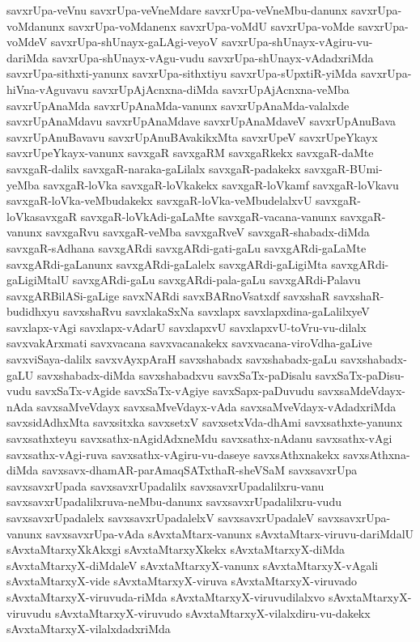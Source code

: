 {savxrUpa-veVnu
savxrUpa-veVneMdare
savxrUpa-veVneMbu-danunx
savxrUpa-voMdanunx
savxrUpa-voMdanenx
savxrUpa-voMdU
savxrUpa-voMde
savxrUpa-voMdeV
savxrUpa-shUnayx-gaLAgi-veyoV
savxrUpa-shUnayx-vAgiru-vu-dariMda
savxrUpa-shUnayx-vAgu-vudu
savxrUpa-shUnayx-vAdadxriMda
savxrUpa-sithxti-yanunx
savxrUpa-sithxtiyu
savxrUpa-sUpxtiR-yiMda
savxrUpa-hiVna-vAguvavu
savxrUpAjAcnxna-diMda
savxrUpAjAcnxna-veMba
savxrUpAnaMda
savxrUpAnaMda-vanunx
savxrUpAnaMda-valalxde
savxrUpAnaMdavu
savxrUpAnaMdave
savxrUpAnaMdaveV
savxrUpAnuBava
savxrUpAnuBavavu
savxrUpAnuBAvakikxMta
savxrUpeV
savxrUpeYkayx
savxrUpeYkayx-vanunx
savxgaR
savxgaRM
savxgaRkekx
savxgaR-daMte
savxgaR-dalilx
savxgaR-naraka-gaLilalx
savxgaR-padakekx
savxgaR-BUmi-yeMba
savxgaR-loVka
savxgaR-loVkakekx
savxgaR-loVkamf
savxgaR-loVkavu
savxgaR-loVka-veMbudakekx
savxgaR-loVka-veMbudelalxvU
savxgaR-loVkasavxgaR
savxgaR-loVkAdi-gaLaMte
savxgaR-vacana-vanunx
savxgaR-vanunx
savxgaRvu
savxgaR-veMba
savxgaRveV
savxgaR-shabadx-diMda
savxgaR-sAdhana
savxgARdi
savxgARdi-gati-gaLu
savxgARdi-gaLaMte
savxgARdi-gaLanunx
savxgARdi-gaLalelx
savxgARdi-gaLigiMta
savxgARdi-gaLigiMtalU
savxgARdi-gaLu
savxgARdi-pala-gaLu
savxgARdi-Palavu
savxgARBilASi-gaLige
savxNARdi
savxBARnoVsatxdf
savxshaR
savxshaR-budidhxyu
savxshaRvu
savxlakaSxNa
savxlapx
savxlapxdina-gaLalilxyeV
savxlapx-vAgi
savxlapx-vAdarU
savxlapxvU
savxlapxvU-toVru-vu-dilalx
savxvakArxmati
savxvacana
savxvacanakekx
savxvacana-viroVdha-gaLive
savxviSaya-dalilx
savxvAyxpAraH
savxshabadx
savxshabadx-gaLu
savxshabadx-gaLU
savxshabadx-diMda
savxshabadxvu
savxSaTx-paDisalu
savxSaTx-paDisu-vudu
savxSaTx-vAgide
savxSaTx-vAgiye
savxSapx-paDuvudu
savxsaMdeVdayx-nAda
savxsaMveVdayx
savxsaMveVdayx-vAda
savxsaMveVdayx-vAdadxriMda
savxsidAdhxMta
savxsitxka
savxsetxV
savxsetxVda-dhAmi
savxsathxte-yanunx
savxsathxteyu
savxsathx-nAgidAdxneMdu
savxsathx-nAdanu
savxsathx-vAgi
savxsathx-vAgi-ruva
savxsathx-vAgiru-vu-daseye
savxsAthxnakekx
savxsAthxna-diMda
savxsavx-dhamAR-parAmaqSATxthaR-sheVSaM
savxsavxrUpa
savxsavxrUpada
savxsavxrUpadalilx
savxsavxrUpadalilxru-vanu
savxsavxrUpadalilxruva-neMbu-danunx
savxsavxrUpadalilxru-vudu
savxsavxrUpadalelx
savxsavxrUpadalelxV
savxsavxrUpadaleV
savxsavxrUpa-vanunx
savxsavxrUpa-vAda
sAvxtaMtarx-vanunx
sAvxtaMtarx-viruvu-dariMdalU
sAvxtaMtarxyXkAkxgi
sAvxtaMtarxyXkekx
sAvxtaMtarxyX-diMda
sAvxtaMtarxyX-diMdaleV
sAvxtaMtarxyX-vanunx
sAvxtaMtarxyX-vAgali
sAvxtaMtarxyX-vide
sAvxtaMtarxyX-viruva
sAvxtaMtarxyX-viruvado
sAvxtaMtarxyX-viruvuda-riMda
sAvxtaMtarxyX-viruvudilalxvo
sAvxtaMtarxyX-viruvudu
sAvxtaMtarxyX-viruvudo
sAvxtaMtarxyX-vilalxdiru-vu-dakekx
sAvxtaMtarxyX-vilalxdadxriMda
}
